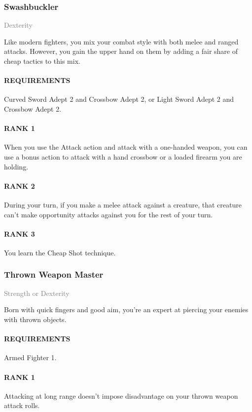 \subsubsection{Swashbuckler} \label{feat::swashbuckler}
\small{\textcolor{gray}{Dexterity}}

\normalsize
Like modern fighters, you mix your combat style with both melee and ranged attacks.
However, you gain the upper hand on them by adding a fair share of cheap tactics to this mix.
\paragraph{REQUIREMENTS} Curved Sword Adept 2 and Crossbow Adept 2, or Light Sword Adept 2 and Crossbow Adept 2.
\paragraph{RANK 1} When you use the Attack action and attack with a one-handed weapon, you can use a bonus action to attack with a hand crossbow or a loaded firearm you are holding.
\paragraph{RANK 2} During your turn, if you make a melee attack against a creature, that creature can't make opportunity attacks against you for the rest of your turn.
\paragraph{RANK 3} You learn the Cheap Shot technique.

\subsubsection{Thrown Weapon Master} \label{feat::thrownweaponmaster}
\small{\textcolor{gray}{Strength or Dexterity}}

\normalsize
Born with quick fingers and good aim, you're an expert at piercing your enemies with thrown objects.
\paragraph{REQUIREMENTS} Armed Fighter 1.
\paragraph{RANK 1} Attacking at long range doesn't impose disadvantage on your thrown weapon attack rolls.
